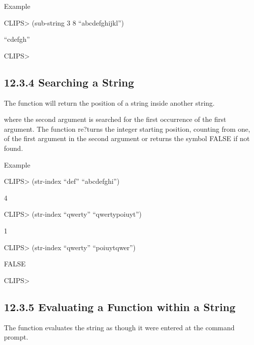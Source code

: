\documentclass[letterpaper,10pt,english]{sphinxmanual}
\begin{document}
Example

CLIPS\textgreater{} (sub-string 3 8 “abcdefghijkl”)

“cdefgh”

CLIPS\textgreater{}


\subsection{12.3.4 Searching a String}
\label{\detokenize{actions:searching-a-string}}
The  function will return the position of a string inside
another string.


\begin{sphinxVerbatim}[commandchars=\\\{\}]
  
\end{sphinxVerbatim}

where the second argument is searched for the first occurrence of the
first argument. The  function re?turns the integer starting
position, counting from one, of the first argument in the second
argument or returns the symbol FALSE if not found.

Example

CLIPS\textgreater{} (str-index “def” “abcdefghi”)

4

CLIPS\textgreater{} (str-index “qwerty” “qwertypoiuyt”)

1

CLIPS\textgreater{} (str-index “qwerty” “poiuytqwer”)

FALSE

CLIPS\textgreater{}


\subsection{12.3.5 Evaluating a Function within a String}
\label{\detokenize{actions:evaluating-a-function-within-a-string}}
The  function evaluates the string as though it were entered at
the command prompt.


\begin{sphinxVerbatim}[commandchars=\\\{\}]
 
\end{sphinxVerbatim}
\end{document}

